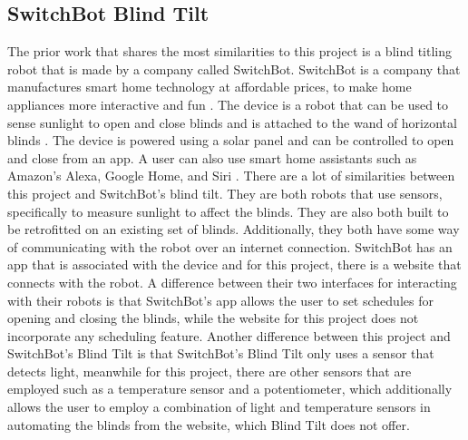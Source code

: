 \documentclass[10pt,twocolumn]{article}
\begin{document}
\subsection{SwitchBot Blind Tilt}
The prior work that shares the most similarities to this project is a blind titling robot that is made by a company called SwitchBot. SwitchBot is a company that manufactures smart home technology at affordable prices, to make home appliances more interactive and fun \cite{SwitchBot2022}. The device is a robot that can be used to sense sunlight to open and close blinds and is attached to the wand of horizontal blinds \cite{WonderTechLab2022SwitchBot}. The device is powered using a solar panel and can be controlled to open and close from an app. A user can also use smart home assistants such as Amazon’s Alexa, Google Home, and Siri \cite{WonderTechLab2022SwitchBot}. There are a lot of similarities between this project and SwitchBot’s blind tilt. They are both robots that use sensors, specifically to measure sunlight to affect the blinds. They are also both built to be retrofitted on an existing set of blinds. Additionally, they both have some way of communicating with the robot over an internet connection. SwitchBot has an app that is associated with the device and for this project, there is a website that connects with the robot. A difference between their two interfaces for interacting with their robots is that SwitchBot’s app allows the user to set schedules for opening and closing the blinds, while the website for this project does not incorporate any scheduling feature. Another difference between this project and SwitchBot’s Blind Tilt is that SwitchBot’s Blind Tilt only uses a sensor that detects light, meanwhile for this project, there are other sensors that are employed such as a temperature sensor and a potentiometer, which additionally allows the user to employ a combination of light and temperature sensors in automating the blinds from the website, which Blind Tilt does not offer. 
\end{document}
